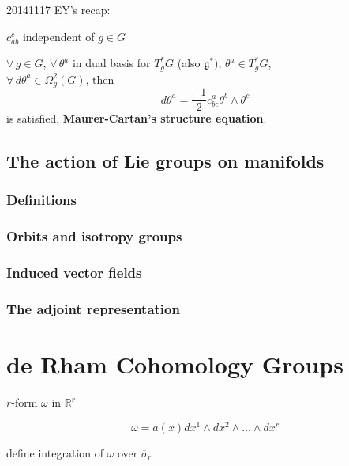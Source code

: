 \documentclass{book}
\begin{document}
\hrulefill

20141117 EY's recap:

$c^{c}_{ab}$ independent of $g \in G$

$\forall \, g\in G$, $\forall \, \theta^a$ in dual basis for $T_g^*G$ (also $\mathfrak{g}^*$), $\theta^a \in T_g^*G$, \\
$\forall \, d\theta^a \in \Omega^2_g(G)$, then 
\[
d\theta^a = \frac{-1}{2} c^a_{bc} \theta^b \wedge \theta^c
\]
is satisfied, \textbf{Maurer-Cartan's structure equation}.


\hrulefill


\section{ The action of Lie groups on manifolds }




\subsection{ Definitions} 


\subsection{ Orbits and isotropy groups }


\subsection{ Induced vector fields }

\subsection{ The adjoint representation }














\chapter{de Rham Cohomology Groups}

$r$-form $\omega$ in $\mathbb{R}^r$

\[
\omega = a(x) dx^1 \wedge dx^2 \wedge \dots \wedge dx^r
\]

define integration of $\omega$ over $\overline{\sigma}_r$ 
\end{document}

